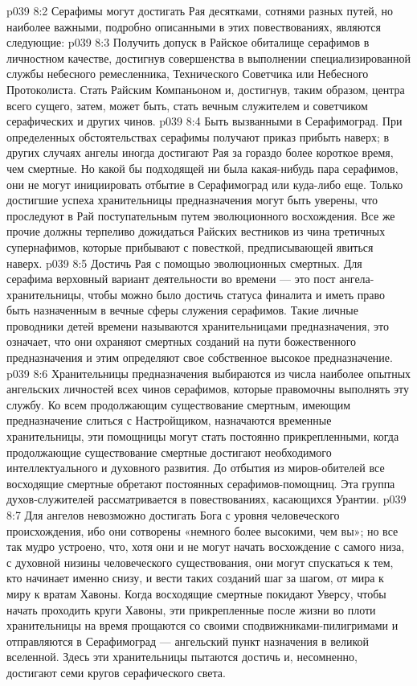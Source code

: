 \vs p039 8:2 \pc Серафимы могут достигать Рая десятками, сотнями разных путей, но наиболее важными, подробно описанными в этих повествованиях, являются следующие:
\vs p039 8:3 \bibnobreakspace Получить допуск в Райское обиталище серафимов в личностном качестве, достигнув совершенства в выполнении специализированной службы небесного ремесленника, Технического Советчика или Небесного Протоколиста. Стать Райским Компаньоном и, достигнув, таким образом, центра всего сущего, затем, может быть, стать вечным служителем и советчиком серафических и других чинов.
\vs p039 8:4 \bibnobreakspace Быть вызванными в Серафимоград. При определенных обстоятельствах серафимы получают приказ прибыть наверх; в других случаях ангелы иногда достигают Рая за гораздо более короткое время, чем смертные. Но какой бы подходящей ни была какая\hyp{}нибудь пара серафимов, они не могут инициировать отбытие в Серафимоград или куда\hyp{}либо еще. Только достигшие успеха хранительницы предназначения могут быть уверены, что проследуют в Рай поступательным путем эволюционного восхождения. Все же прочие должны терпеливо дожидаться Райских вестников из чина третичных супернафимов, которые прибывают с повесткой, предписывающей явиться наверх.
\vs p039 8:5 \bibnobreakspace Достичь Рая с помощью эволюционных смертных. Для серафима верховный вариант деятельности во времени --- это пост ангела\hyp{}хранительницы, чтобы можно было достичь статуса финалита и иметь право быть назначенным в вечные сферы служения серафимов. Такие личные проводники детей времени называются хранительницами предназначения, это означает, что они охраняют смертных созданий на пути божественного предназначения и этим определяют свое собственное высокое предназначение.
\vs p039 8:6 Хранительницы предназначения выбираются из числа наиболее опытных ангельских личностей всех чинов серафимов, которые правомочны выполнять эту службу. Ко всем продолжающим существование смертным, имеющим предназначение слиться с Настройщиком, назначаются временные хранительницы, эти помощницы могут стать постоянно прикрепленными, когда продолжающие существование смертные достигают необходимого интеллектуального и духовного развития. До отбытия из миров\hyp{}обителей все восходящие смертные обретают постоянных серафимов\hyp{}помощниц. Эта группа духов\hyp{}служителей рассматривается в повествованиях, касающихся Урантии.
\vs p039 8:7 \pc Для ангелов невозможно достигать Бога с уровня человеческого происхождения, ибо они сотворены «немного более высокими, чем вы»; но все так мудро устроено, что, хотя они и не могут начать восхождение с самого низа, с духовной низины человеческого существования, они могут спускаться к тем, кто начинает именно снизу, и вести таких созданий шаг за шагом, от мира к миру к вратам Хавоны. Когда восходящие смертные покидают Уверсу, чтобы начать проходить круги Хавоны, эти прикрепленные после жизни во плоти хранительницы на время прощаются со своими сподвижниками\hyp{}пилигримами и отправляются в Серафимоград --- ангельский пункт назначения в великой вселенной. Здесь эти хранительницы пытаются достичь и, несомненно, достигают семи кругов серафического света.
